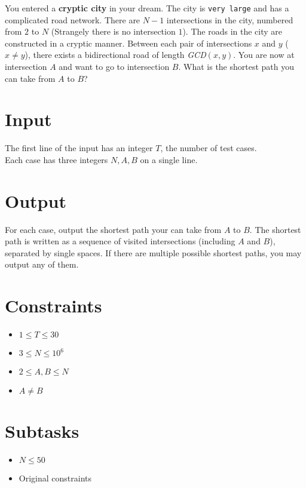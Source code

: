 
You entered a {\bf cryptic city} in your dream.
The city is {\tt very large} and has a complicated road network.
There are $N - 1$ intersections in the city, numbered from $2$ to $N$ (Strangely there is no intersection $1$).
The roads in the city are constructed in a cryptic manner.
Between each pair of intersections $x$ and $y$ ($x \neq y$), there exists a bidirectional road of length {\it GCD}$(x, y)$.
You are now at intersection $A$ and want to go to intersection $B$.
What is the shortest path you can take from $A$ to $B$?

\section*{Input}

The first line of the input has an integer $T$, the number of test cases.\\
Each case has three integers $N, A, B$ on a single line.

\section*{Output}

For each case, output the shortest path your can take from $A$ to $B$. The shortest path is written as a sequence of visited intersections (including $A$ and $B$), separated by single spaces. If there are multiple possible shortest paths, you may output any of them.

\section*{Constraints}
\begin{itemize}
\item $1 \leq T\leq 30$
\item $3 \leq N \leq 10^6$
\item $2 \leq A, B \leq N$
\item $A \neq B$
\end{itemize}

\section*{Subtasks}
\begin{itemize}
  \item $N \leq 50$
  \item Original constraints
\end{itemize}


